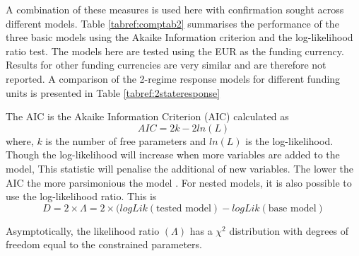\documentclass[12pt, a4paper, oneside]{article} %
\begin{document}
A combination of these measures is used here with confirmation sought across different models.  Table \ref{tabref:comptab2} summarises the performance of the three basic models using the Akaike Information criterion and the log-likelihood ratio test.  The models here are tested using the EUR as the funding currency.  Results for other funding currencies are very similar and are therefore not reported.  A comparison of the 2-regime response models for different funding units is presented in Table \ref{tabref:2stateresponse} 

The AIC is the Akaike Information Criterion (AIC) calculated as 
\begin{equation}
AIC = 2k - 2ln(L) 
\end{equation}
where, $k$ is the number of free parameters and $ln(L)$ is the log-likelihood.  Though the log-likelihood will increase when more variables are added to the model, This statistic will penalise the additional of new variables.  The lower the AIC the more parsimonious the model \citet{AIC}. For nested models, it is also possible to use the log-likelihood ratio.  This is 
\begin{equation}
D = 2 \times \Lambda = 2 \times (logLik(\text{tested model}) - logLik(\text{base model})
\end{equation}

Asymptotically, the likelihood ratio $(\Lambda)$ has a $\chi^2$ distribution with degrees of freedom equal to the constrained parameters. 
\end{document}
